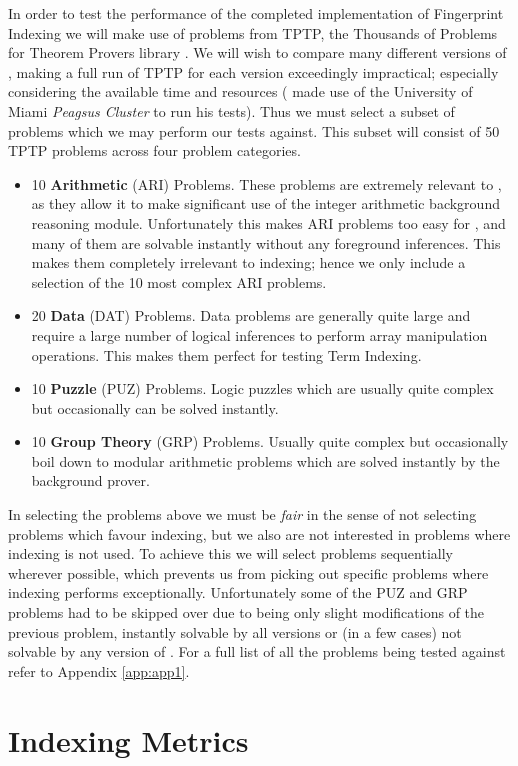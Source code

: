In order to test the performance of the completed implementation of Fingerprint Indexing
we will make use of problems from TPTP, the Thousands of Problems for Theorem Provers
library \cite{tptp}.
We will wish to compare many different versions of \beagle, making a full run of TPTP
for each version
exceedingly impractical; especially considering the available time and resources (
made use of the University of Miami \emph{Peagsus Cluster} to run his tests). Thus
we must select a subset of problems which we may perform our tests against.
This subset will consist of 50 TPTP problems across four problem categories.
\begin{itemize}
\item 10 \textbf{Arithmetic} (ARI) Problems. These problems are extremely relevant
to \beagle, as they allow it to make significant use of the integer arithmetic
background reasoning module. Unfortunately this makes ARI problems too easy for \beagle,
and many of them are solvable instantly without any foreground inferences. This makes
them completely irrelevant to indexing; hence we only include a selection of the 10 most complex ARI problems. 
\item 20 \textbf{Data} (DAT) Problems. Data problems are generally quite large and
require a large number of logical inferences to perform array manipulation operations.
This makes them perfect for testing Term Indexing.
\item 10 \textbf{Puzzle} (PUZ) Problems. Logic puzzles which are usually quite
complex but occasionally can be solved instantly.
\item 10 \textbf{Group Theory} (GRP) Problems. Usually quite complex but occasionally
boil down to modular arithmetic problems which are solved instantly by the background prover.
\end{itemize}
In selecting the problems above we must be \emph{fair} in the sense of not selecting
problems which favour indexing, but we also are not interested in problems where
indexing is not used. To achieve this we will select problems sequentially wherever
possible, which prevents us from picking out specific problems where indexing
performs exceptionally. Unfortunately some of the PUZ and GRP problems had
to be skipped over due to being only slight modifications of the previous problem, instantly solvable by all versions
or (in a few cases) not solvable by any version of \beagle. For a full
list of all the problems being tested against refer to Appendix \ref{app:app1}.

\section{Indexing Metrics}
\label{sec:metrics}

